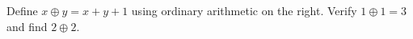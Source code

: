 Define $x\oplus y=x+y+1$ using ordinary arithmetic on the right. Verify $1\oplus1=3$ and find $2\oplus2$.
